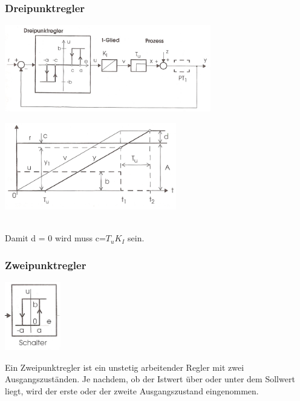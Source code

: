	\subsubsection{Dreipunktregler }
		\begin{minipage}{9cm}
		\includegraphics[width=9cm]{./bilder/Dreipunktregler.jpg}
        \end{minipage}
		\begin{minipage}{7.5cm}
        \includegraphics[width=7.5cm]{./bilder/Dreipunktregler_dia.jpg}
        \end{minipage}\\
		Damit d = 0 wird muss c=$T_u K_I$ sein.
\newpage
		
		
	\subsubsection{Zweipunktregler }
		\begin{minipage}{3cm}
 		\includegraphics[height=3cm]{./bilder/Zweipunktregler.jpg}
        \end{minipage}
		\begin{minipage}{15cm}
        Ein Zweipunktregler ist ein unstetig arbeitender Regler mit zwei
        Ausgangszuständen. Je nachdem, ob der Istwert über oder unter dem
        Sollwert liegt, wird der erste oder der zweite Ausgangszustand
        eingenommen.   
        \end{minipage}

